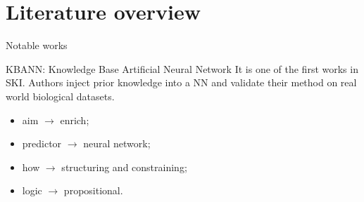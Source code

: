 \documentclass[presentation]{beamer}\mode<presentation>{\usetheme{AMSBolognaFC}}
\begin{document}
\section{Literature overview}

\begin{frame}[c]{Notable works}
    \begin{block}{KBANN: Knowledge Base Artificial Neural Network }
        It is one of the first works in SKI.
        Authors inject prior knowledge into a NN and validate their method on real world biological datasets.
        \begin{itemize}
            \item aim $\rightarrow$ enrich;
            \item predictor $\rightarrow$ neural network;
            \item how $\rightarrow$ structuring and constraining;
            \item logic $\rightarrow$ propositional.
        \end{itemize}        
    \end{block}
\end{frame}
\end{document}
